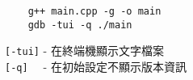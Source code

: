 \begin{lstlisting}
    g++ main.cpp -g -o main
    gdb -tui -q ./main
\end{lstlisting}
\verb|[-tui]| - 在終端機顯示文字檔案 \\
\verb|[-q]  | - 在初始設定不顯示版本資訊 \\